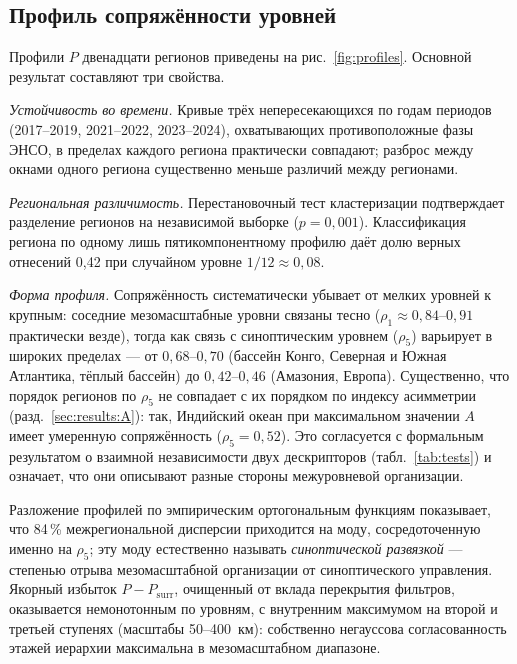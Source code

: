 \documentclass[11pt,a4paper]{article}
\begin{document}
\subsection{Профиль сопряжённости уровней}
\label{sec:results:P}

Профили $P$ двенадцати регионов приведены на рис.~\ref{fig:profiles}. Основной результат составляют три свойства.

\emph{Устойчивость во времени.} Кривые трёх непересекающихся по годам периодов (2017--2019, 2021--2022, 2023--2024), охватывающих противоположные фазы ЭНСО, в пределах каждого региона практически совпадают; разброс между окнами одного региона существенно меньше различий между регионами.

\emph{Региональная различимость.} Перестановочный тест кластеризации подтверждает разделение регионов на независимой выборке ($p=0{,}001$). Классификация региона по одному лишь пятикомпонентному профилю даёт долю верных отнесений 0{,}42 при случайном уровне $1/12\approx0{,}08$.

\emph{Форма профиля.} Сопряжённость систематически убывает от мелких уровней к крупным: соседние мезомасштабные уровни связаны тесно ($\rho_1\approx0{,}84$--$0{,}91$ практически везде), тогда как связь с синоптическим уровнем ($\rho_5$) варьирует в широких пределах --- от $0{,}68$--$0{,}70$ (бассейн Конго, Северная и Южная Атлантика, тёплый бассейн) до $0{,}42$--$0{,}46$ (Амазония, Европа). Существенно, что порядок регионов по $\rho_5$ не совпадает с их порядком по индексу асимметрии (разд.~\ref{sec:results:A}): так, Индийский океан при максимальном значении $A$ имеет умеренную сопряжённость ($\rho_5=0{,}52$). Это согласуется с формальным результатом о взаимной независимости двух дескрипторов (табл.~\ref{tab:tests}) и означает, что они описывают разные стороны межуровневой организации.

Разложение профилей по эмпирическим ортогональным функциям показывает, что 84\,\% межрегиональной дисперсии приходится на моду, сосредоточенную именно на $\rho_5$; эту моду естественно называть \emph{синоптической развязкой} --- степенью отрыва мезомасштабной организации от синоптического управления. Якорный избыток $P-P_{\mathrm{surr}}$, очищенный от вклада перекрытия фильтров, оказывается немонотонным по уровням, с внутренним максимумом на второй и третьей ступенях (масштабы 50--400~км): собственно негауссова согласованность этажей иерархии максимальна в мезомасштабном диапазоне.
\end{document}
